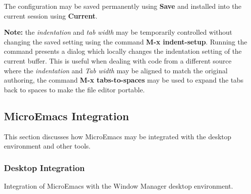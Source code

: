 \documentclass[11pt,a4paper,pdftex]{article}
\begin{document}
  The configuration may be saved permanently using \textbf{Save} and installed
  into the current session using \textbf{Current}.
  
  \textbf{Note:} the \textit{indentation} and \textit{tab width} may be
  temporarily controlled without changing the saved setting using the command
  \textbf{M-x indent-setup}. Running the command presents a dialog which
  locally changes the indentation setting of the current buffer. This is
  useful when dealing with code from a different source where the
  \textit{indentation} and \textit{Tab width} may be aligned to match the
  original authoring, the command \textbf{M-x tabs-to-spaces} may be used to
  expand the tabs back to spaces to make the file editor portable.

\subsection{MicroEmacs Integration}

  This section discusses how MicroEmacs may be integrated with the desktop
  environment and other tools.

\subsubsection{Desktop Integration}

  Integration of MicroEmacs with the Window Manager desktop environment.
\end{document}
